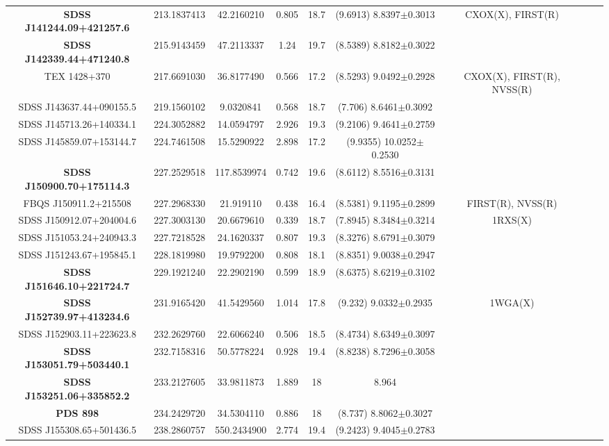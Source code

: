 \begin{table}
\begin{tabular}{|c| c| c| c| c| c| c| c| c|}
\textbf{SDSS J141244.09+421257.6} 		&213.1837413		&42.2160210		&0.805			&18.7		&(9.6913)	 8.8397$\pm$0.3013& CXOX(X), FIRST(R)\\
\textbf{SDSS J142339.44+471240.8} 		&215.9143459		&47.2113337		&1.24			&19.7		&(8.5389) 8.8182$\pm$0.3022&\\
TEX 1428+370				            	&217.6691030		&36.8177490		&0.566			&17.2		&(8.5293) 9.0492$\pm$0.2928& CXOX(X), FIRST(R), NVSS(R) \\
SDSS J143637.44+090155.5 		&219.1560102		&9.0320841			&0.568			&18.7		&(7.706) 8.6461$\pm$0.3092&\\
SDSS J145713.26+140334.1 		&224.3052882		&14.0594797		&2.926			&19.3		&(9.2106) 9.4641$\pm$0.2759&\\
SDSS J145859.07+153144.7 		&224.7461508		&15.5290922		&2.898			&17.2		&(9.9355)	 10.0252$\pm$0.2530&\\
\textbf{SDSS J150900.70+175114.3} 		&227.2529518		&117.8539974		&0.742			&19.6		&(8.6112)	 8.5516$\pm$0.3131&\\
FBQS J150911.2+215508    		&227.2968330		&21.919110			&0.438			&16.4		&(8.5381)	 9.1195$\pm$0.2899& FIRST(R), NVSS(R)\\
SDSS J150912.07+204004.6 		&227.3003130		&20.6679610		&0.339			&18.7		&(7.8945)	 8.3484$\pm$0.3214& 1RXS(X) \\
SDSS J151053.24+240943.3 		&227.7218528		&24.1620337		&0.807			&19.3		&(8.3276) 8.6791$\pm$0.3079&\\
SDSS J151243.67+195845.1 		&228.1819980		&19.9792200		&0.808			&18.1		&(8.8351)	 9.0038$\pm$0.2947&\\
\textbf{SDSS J151646.10+221724.7} 		&229.1921240		&22.2902190		&0.599			&18.9		&(8.6375) 8.6219$\pm$0.3102	&\\
\textbf{SDSS J152739.97+413234.6} 		&231.9165420		&41.5429560		&1.014			&17.8		&(9.232) 9.0332$\pm$0.2935		&1WGA(X) \\
SDSS J152903.11+223623.8 		&232.2629760		&22.6066240		&0.506			&18.5		&(8.4734) 8.6349$\pm$0.3097	&\\
\textbf{SDSS J153051.79+503440.1} 		&232.7158316		&50.5778224		&0.928			&19.4		&(8.8238)	 8.7296$\pm$0.3058&\\
\textbf{SDSS J153251.06+335852.2} 		&233.2127605		&33.9811873		&1.889			&18			&8.964		&\\
\textbf{PDS 898}						               	&234.2429720		&34.5304110		&0.886			&18			&(8.737) 8.8062$\pm$0.3027		&\\
SDSS J155308.65+501436.5 		&238.2860757		&550.2434900		&2.774			&19.4		&(9.2423) 9.4045$\pm$0.2783&\\

\end{tabular}
\end{table}
